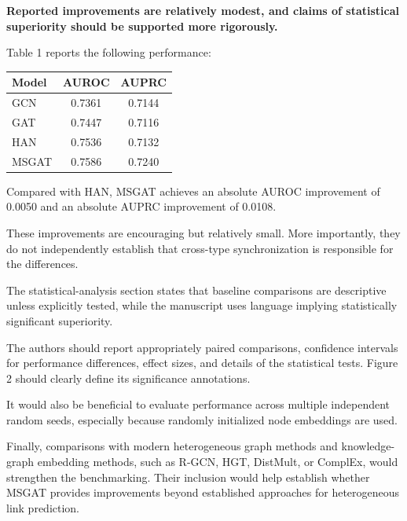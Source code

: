 \documentclass[11pt,american]{article}
\begin{document}
\begin{revresponse}

\end{revresponse}

\begin{revcomment}
\textbf{Reported improvements are relatively modest, and claims of statistical superiority should be supported more rigorously.}

Table 1 reports the following performance:

\vspace{1mm}
\begin{tabular}{@{}lcc@{}}
\toprule
Model & AUROC & AUPRC \\
\midrule
GCN & 0.7361 & 0.7144 \\
GAT & 0.7447 & 0.7116 \\
HAN & 0.7536 & 0.7132 \\
MSGAT & 0.7586 & 0.7240 \\
\bottomrule
\end{tabular}
\vspace{1mm}

Compared with HAN, MSGAT achieves an absolute AUROC improvement of 0.0050 and an absolute AUPRC improvement of 0.0108.

These improvements are encouraging but relatively small. More importantly, they do not independently establish that cross-type synchronization is responsible for the differences.

The statistical-analysis section states that baseline comparisons are descriptive unless explicitly tested, while the manuscript uses language implying statistically significant superiority.

The authors should report appropriately paired comparisons, confidence intervals for performance differences, effect sizes, and details of the statistical tests. Figure 2 should clearly define its significance annotations.

It would also be beneficial to evaluate performance across multiple independent random seeds, especially because randomly initialized node embeddings are used.

Finally, comparisons with modern heterogeneous graph methods and knowledge-graph embedding methods, such as R-GCN, HGT, DistMult, or ComplEx, would strengthen the benchmarking. Their inclusion would help establish whether MSGAT provides improvements beyond established approaches for heterogeneous link prediction.
\end{revcomment}
\end{document}
